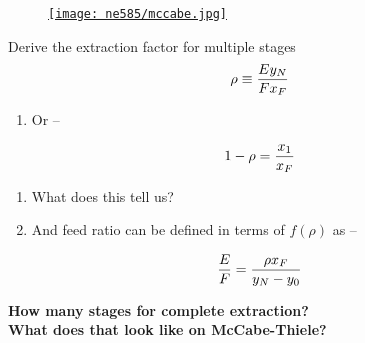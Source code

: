 \documentclass[aspectratio=1610,pdftex,dvipsnames,compress,xcolor={dvipsnames}]{beamer}
\begin{document}
\begin{frame}{}
    \begin{figure}
        \centering
        \href{http://www.tsijournals.com/articles-images/chemical-technology-McCabe-Thiele-uranium-11-5-102-g015.png}{\texttt{[image: ne585/mccabe.jpg]}}
    \end{figure}
\end{frame}


\begin{frame}{Derive the extraction factor for multiple stages}
    \begin{equation}
        \LARGE
        \rho \equiv \frac{Ey_N}{Fx_F}
    \end{equation}
    
    \vspace*{\fill}

    \begin{enumerate}[topsep=0pt,itemsep=18pt,leftmargin=*,label=(\arabic*)]
        \item[]Or -- 
    \end{enumerate}

    \vspace*{\fill}

    \begin{equation}
        \LARGE
        1 - \rho = \frac{x_1}{x_F}
    \end{equation}

    \vspace*{\fill}

    \begin{enumerate}[topsep=0pt,itemsep=18pt,leftmargin=*,label=(\arabic*)]
        \item[]What does this tell us?
        \item[]And feed ratio can be defined in terms of $f(\rho)$ as --
    \end{enumerate}

    \vspace*{\fill}

    \begin{equation}
        \LARGE
        \frac{E}{F} = \frac{\rho x_F}{y_N-y_0}
    \end{equation}
\end{frame}


\begin{frame}[plain]{}
    \centering\LARGE\textbf{How many stages for complete extraction?}\\
    \centering\LARGE\textbf{What does that look like on McCabe-Thiele?}
\end{frame}
\end{document}
